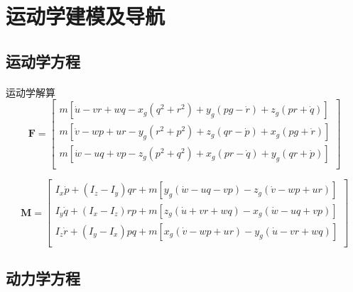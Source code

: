 \documentclass{ctexart}
\begin{document}
	\section{运动学建模及导航}
	\subsection{运动学方程}
    \paragraph{}运动学解算 
	\[
	\mathbf{F}=
	\begin{bmatrix}
		m[\dot{u}-vr+wq-x_g(q^2+r^2)+y_g(pg-\dot{r})+z_g(pr+\dot{q})]\\
		m[\dot{v}-wp+ur-y_g(r^2+p^2)+z_g(qr-\dot{p})+x_g(pg+\dot{r})]\\
		m[\dot{w}-uq+vp-z_g(p^2+q^2)+x_g(pr-\dot{q})+y_g(qr+\dot{p})]\\
	\end{bmatrix}
	\]
	
	\[\mathbf{M}=
	\begin{bmatrix}
		I_x\dot{p}+(I_z-I_y)qr+m[y_g(\dot{w}-uq-vp)-z_g(\dot{v}-wp+ur)]\\
		I_y\dot{q}+(I_x-I_z)rp+m[z_g(\dot{u}+vr+wq)-x_g(\dot{w}-uq+vp)]\\
		I_z\dot{r}+(I_y-I_x)pq+m[x_g(\dot{v}-wp+ur)-y_g(\dot{u}-vr+wq)]\\
		
	\end{bmatrix}
	\]
	\subsection{动力学方程}
\end{document}
